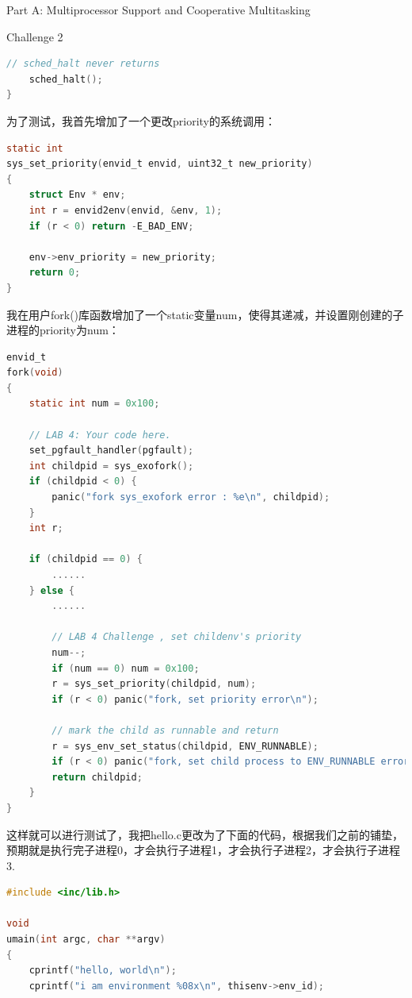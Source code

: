 \documentclass[GBK,winfonts,a4paper,10pt]{ctexart}
\begin{document}
\begin{section}{Part A: Multiprocessor Support and Cooperative Multitasking}
\begin{subsection}{Challenge 2}
\begin{lstlisting}[language=C]
	// sched_halt never returns
	sched_halt();
}
\end{lstlisting}
\par
为了测试，我首先增加了一个更改priority的系统调用：
\begin{lstlisting}[language=C]
static int
sys_set_priority(envid_t envid, uint32_t new_priority)
{
	struct Env * env;
	int r = envid2env(envid, &env, 1);	
	if (r < 0) return -E_BAD_ENV;
	
	env->env_priority = new_priority;
	return 0;
}
\end{lstlisting}
\par
我在用户fork()库函数增加了一个static变量num，使得其递减，并设置刚创建的子进程的priority为num：
\begin{lstlisting}[language=C]
envid_t
fork(void)
{
	static int num = 0x100;

	// LAB 4: Your code here.
	set_pgfault_handler(pgfault);
	int childpid = sys_exofork();
	if (childpid < 0) {
		panic("fork sys_exofork error : %e\n", childpid);
	}
	int r;

	if (childpid == 0) {
		......
	} else {
		......

		// LAB 4 Challenge , set childenv's priority
		num--;
		if (num == 0) num = 0x100;
		r = sys_set_priority(childpid, num);
		if (r < 0) panic("fork, set priority error\n");

		// mark the child as runnable and return
		r = sys_env_set_status(childpid, ENV_RUNNABLE);
		if (r < 0) panic("fork, set child process to ENV_RUNNABLE error : %e\n", r);
		return childpid;
	}
}
\end{lstlisting}
\par
这样就可以进行测试了，我把hello.c更改为了下面的代码，根据我们之前的铺垫，预期就是执行完子进程0，才会执行子进程1，才会执行子进程2，才会执行子进程3.
\begin{lstlisting}[language=C]
#include <inc/lib.h>

void
umain(int argc, char **argv)
{
	cprintf("hello, world\n");
	cprintf("i am environment %08x\n", thisenv->env_id);


\end{lstlisting}
\end{subsection}
\end{section}
\end{document}
